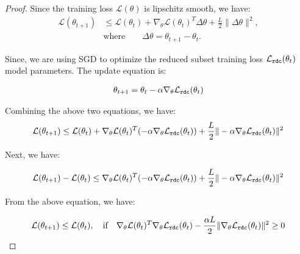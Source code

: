 
\begin{proof}
    Since the training loss $\mathcal{L}(\theta)$ is lipschitz smooth, we have:
\begin{align}
    \mathcal{L}(\theta_{t+1}) & \leq \mathcal{L}(\theta_t) + \nabla_{\theta} \mathcal{L}(\theta_t)^T\Delta \theta + \frac{L}{2}\|\Delta\theta\|^2, \\
    &\text{where} \qquad \Delta\theta=\theta_{t+1} - \theta_{t}.
\end{align}

Since, we are using SGD to optimize the reduced subset training loss $\mathcal L_{\mathtt{rdc}}(\theta_t)$ model parameters.
The update equation is:

\begin{align}
    \theta_{t+1} = \theta_{t} - \alpha \nabla_{\theta} \mathcal L_{\mathtt{rdc}}(\theta_t)
\end{align}

Combining the above two equations, we have:
\begin{align}
    \mathcal{L}(\theta_{t+1}) \leq \mathcal{L}(\theta_t) + \nabla_{\theta} \mathcal{L}(\theta_t)^T(- \alpha \nabla_{\theta} \mathcal L_{\mathtt{rdc}}(\theta_t)) + \frac{L}{2}\|- \alpha \nabla_{\theta} \mathcal L_{\mathtt{rdc}}(\theta_t)\|^2
\end{align}

Next, we have:

\begin{align}
    \mathcal{L}(\theta_{t+1}) - \mathcal{L}(\theta_t) \leq \nabla_{\theta} \mathcal{L}(\theta_t)^T(- \alpha \nabla_{\theta} \mathcal L_{\mathtt{rdc}}(\theta_t)) + \frac{L}{2}\|- \alpha \nabla_{\theta} \mathcal L_{\mathtt{rdc}}(\theta_t)\|^2
\end{align}

From the above equation, we have:

\begin{align}
    \mathcal{L}(\theta_{t+1}) \leq \mathcal{L}(\theta_{t}), \quad  \text{if} \quad \nabla_{\theta} \mathcal{L}(\theta_{t})^T\nabla_{\theta} \mathcal L_{\mathtt{rdc}}(\theta_t) 
    - \frac{\alpha L}{2}\|\nabla_{\theta} \mathcal L_{\mathtt{rdc}}(\theta_t)\|^2 \geq 0
\end{align}


\end{proof}
